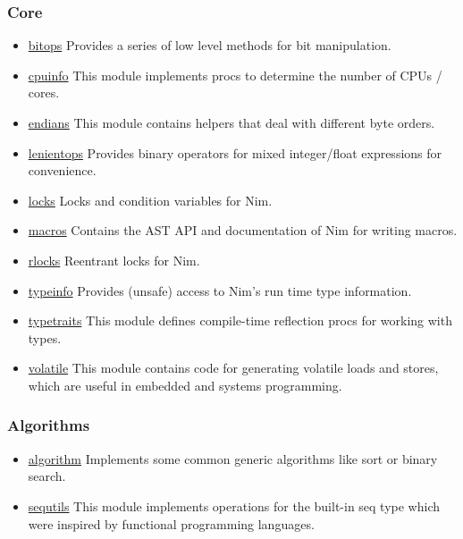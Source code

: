 \hypertarget{core}{%
\subsubsection{Core}\label{core}}

\begin{itemize}
\tightlist
\item
  \href{bitops.html}{bitops} Provides a series of low level methods for
  bit manipulation.
\item
  \href{cpuinfo.html}{cpuinfo} This module implements procs to determine
  the number of CPUs / cores.
\item
  \href{endians.html}{endians} This module contains helpers that deal
  with different byte orders.
\item
  \href{lenientops.html}{lenientops} Provides binary operators for mixed
  integer/float expressions for convenience.
\item
  \href{locks.html}{locks} Locks and condition variables for Nim.
\item
  \href{macros.html}{macros} Contains the AST API and documentation of
  Nim for writing macros.
\item
  \href{rlocks.html}{rlocks} Reentrant locks for Nim.
\item
  \href{typeinfo.html}{typeinfo} Provides (unsafe) access to Nim's run
  time type information.
\item
  \href{typetraits.html}{typetraits} This module defines compile-time
  reflection procs for working with types.
\item
  \href{volatile.html}{volatile} This module contains code for
  generating volatile loads and stores, which are useful in embedded and
  systems programming.
\end{itemize}

\hypertarget{algorithms}{%
\subsubsection{Algorithms}\label{algorithms}}

\begin{itemize}
\tightlist
\item
  \href{algorithm.html}{algorithm} Implements some common generic
  algorithms like sort or binary search.
\item
  \href{sequtils.html}{sequtils} This module implements operations for
  the built-in seq type which were inspired by functional programming
  languages.
\end{itemize}

